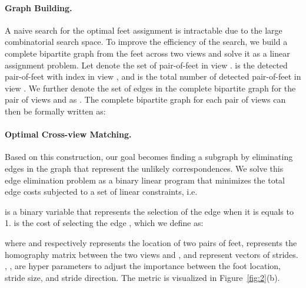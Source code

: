 \documentclass[runningheads]{llncs}
\begin{document}
\paragraph{\bf{Graph Building. }} 
A naive search for the optimal feet assignment is intractable due to the large combinatorial search space. To improve the efficiency of the search, we build a complete bipartite graph from the feet across two views and solve it as a linear assignment problem.
Let 
denote the set of pair-of-feet in view .  is the detected pair-of-feet with index  in view , and  is the total number of detected pair-of-feet in view . We further denote the set of edges in the complete bipartite graph for the pair of views  and  as . The complete bipartite graph for each pair of views can then be formally written as:


\paragraph{\bf{Optimal Cross-view Matching.}} 
Based on this construction, our goal becomes finding a subgraph  by eliminating edges in the graph that represent the unlikely correspondences. We solve this edge elimination problem as a binary linear program that minimizes the total edge costs subjected to a set of linear constraints, i.e.  

 is a binary variable that represents the selection of the edge  when it is equals to 1.  is the cost of selecting the edge , which we define as:

where  and  respectively represents the location of two pairs of feet,  represents the homography matrix between the two views  and ,  and  represent vectors of strides. , ,  are hyper parameters to adjust the importance between the foot location, stride size, and stride direction. The metric is visualized in Figure~\ref{fig:2}(b). 
\end{document}
